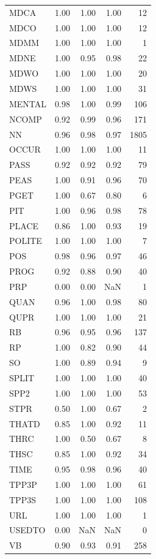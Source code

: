 \documentclass[
  letterpaper,
  DIV=11,
  numbers=noendperiod]{scrreprt}
\begin{document}
\begin{longtable}[]{@{}lrrrr@{}}
MDCA & 1.00 & 1.00 & 1.00 & 12 \\
MDCO & 1.00 & 1.00 & 1.00 & 12 \\
MDMM & 1.00 & 1.00 & 1.00 & 1 \\
MDNE & 1.00 & 0.95 & 0.98 & 22 \\
MDWO & 1.00 & 1.00 & 1.00 & 20 \\
MDWS & 1.00 & 1.00 & 1.00 & 31 \\
MENTAL & 0.98 & 1.00 & 0.99 & 106 \\
NCOMP & 0.92 & 0.99 & 0.96 & 171 \\
NN & 0.96 & 0.98 & 0.97 & 1805 \\
OCCUR & 1.00 & 1.00 & 1.00 & 11 \\
PASS & 0.92 & 0.92 & 0.92 & 79 \\
PEAS & 1.00 & 0.91 & 0.96 & 70 \\
PGET & 1.00 & 0.67 & 0.80 & 6 \\
PIT & 1.00 & 0.96 & 0.98 & 78 \\
PLACE & 0.86 & 1.00 & 0.93 & 19 \\
POLITE & 1.00 & 1.00 & 1.00 & 7 \\
POS & 0.98 & 0.96 & 0.97 & 46 \\
PROG & 0.92 & 0.88 & 0.90 & 40 \\
PRP & 0.00 & 0.00 & NaN & 1 \\
QUAN & 0.96 & 1.00 & 0.98 & 80 \\
QUPR & 1.00 & 1.00 & 1.00 & 21 \\
RB & 0.96 & 0.95 & 0.96 & 137 \\
RP & 1.00 & 0.82 & 0.90 & 44 \\
SO & 1.00 & 0.89 & 0.94 & 9 \\
SPLIT & 1.00 & 1.00 & 1.00 & 40 \\
SPP2 & 1.00 & 1.00 & 1.00 & 53 \\
STPR & 0.50 & 1.00 & 0.67 & 2 \\
THATD & 0.85 & 1.00 & 0.92 & 11 \\
THRC & 1.00 & 0.50 & 0.67 & 8 \\
THSC & 0.85 & 1.00 & 0.92 & 34 \\
TIME & 0.95 & 0.98 & 0.96 & 40 \\
TPP3P & 1.00 & 1.00 & 1.00 & 61 \\
TPP3S & 1.00 & 1.00 & 1.00 & 108 \\
URL & 1.00 & 1.00 & 1.00 & 1 \\
USEDTO & 0.00 & NaN & NaN & 0 \\
VB & 0.90 & 0.93 & 0.91 & 258 \\

\end{longtable}
\end{document}
